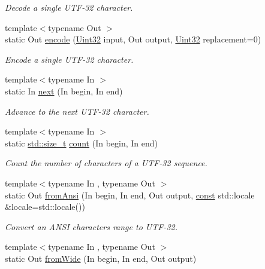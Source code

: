 \begin{DoxyCompactItemize}
\begin{DoxyCompactList}\small\item\em Decode a single U\-T\-F-\/32 character. \end{DoxyCompactList}\item 
{\footnotesize template$<$typename Out $>$ }\\static Out \hyperlink{classsf_1_1_utf_3_0132_01_4_a27b9d3f3fc49a8c88d91966889fcfca1}{encode} (\hyperlink{namespacesf_aa746fb1ddef4410bddf198ebb27e727c}{Uint32} input, Out output, \hyperlink{namespacesf_aa746fb1ddef4410bddf198ebb27e727c}{Uint32} replacement=0)
\begin{DoxyCompactList}\small\item\em Encode a single U\-T\-F-\/32 character. \end{DoxyCompactList}\item 
{\footnotesize template$<$typename In $>$ }\\static In \hyperlink{classsf_1_1_utf_3_0132_01_4_a788b4ebc728dde2aaba38f3605d4867c}{next} (In begin, In end)
\begin{DoxyCompactList}\small\item\em Advance to the next U\-T\-F-\/32 character. \end{DoxyCompactList}\item 
{\footnotesize template$<$typename In $>$ }\\static \hyperlink{nc__alloc_8h_a7b60c5629e55e8ec87a4547dd4abced4}{std\-::size\-\_\-t} \hyperlink{classsf_1_1_utf_3_0132_01_4_a9b18c32b9e6d4b3126e9b4af45988b55}{count} (In begin, In end)
\begin{DoxyCompactList}\small\item\em Count the number of characters of a U\-T\-F-\/32 sequence. \end{DoxyCompactList}\item 
{\footnotesize template$<$typename In , typename Out $>$ }\\static Out \hyperlink{classsf_1_1_utf_3_0132_01_4_a384a4169287af15876783ad477cac4e3}{from\-Ansi} (In begin, In end, Out output, \hyperlink{term__entry_8h_a57bd63ce7f9a353488880e3de6692d5a}{const} std\-::locale \&locale=std\-::locale())
\begin{DoxyCompactList}\small\item\em Convert an A\-N\-S\-I characters range to U\-T\-F-\/32. \end{DoxyCompactList}\item 
{\footnotesize template$<$typename In , typename Out $>$ }\\static Out \hyperlink{classsf_1_1_utf_3_0132_01_4_abdf0d41e0c8814a68326688e3b8d187f}{from\-Wide} (In begin, In end, Out output)

\end{DoxyCompactItemize}
